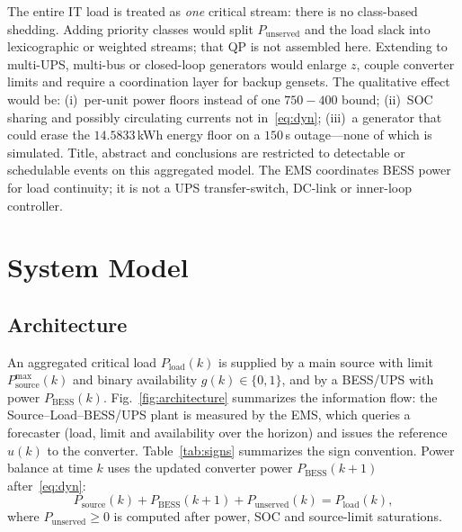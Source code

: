 \documentclass{ieeeaccess}
\begin{document}
The entire IT load is treated as \emph{one} critical stream: there is no class-based shedding. Adding priority classes would split $P_{\mathrm{unserved}}$ and the load slack into lexicographic or weighted streams; that QP is not assembled here. Extending to multi-UPS, multi-bus or closed-loop generators would enlarge $z$, couple converter limits and require a coordination layer for backup gensets. The qualitative effect would be: (i)~per-unit power floors instead of one $750{-}400$ bound; (ii)~SOC sharing and possibly circulating currents not in~\eqref{eq:dyn}; (iii)~a generator that could erase the $14.5833$\,kWh energy floor on a $150$\,s outage---none of which is simulated. Title, abstract and conclusions are restricted to detectable or schedulable events on this aggregated model. The EMS coordinates BESS power for load continuity; it is not a UPS transfer-switch, DC-link or inner-loop controller.

\section{System Model}
\label{sec:model}

\subsection{Architecture}
An aggregated critical load $P_{\mathrm{load}}(k)$ is supplied by a main source with limit $P_{\mathrm{source}}^{\max}(k)$ and binary availability $g(k)\in\{0,1\}$, and by a BESS/UPS with power $P_{\mathrm{BESS}}(k)$. Fig.~\ref{fig:architecture} summarizes the information flow: the Source--Load--BESS/UPS plant is measured by the EMS, which queries a forecaster (load, limit and availability over the horizon) and issues the reference $u(k)$ to the converter. Table~\ref{tab:signs} summarizes the sign convention. Power balance at time $k$ uses the updated converter power $P_{\mathrm{BESS}}(k+1)$ after~\eqref{eq:dyn}:
\begin{equation}
\label{eq:balance}
P_{\mathrm{source}}(k)+P_{\mathrm{BESS}}(k+1)+P_{\mathrm{unserved}}(k)=P_{\mathrm{load}}(k),
\end{equation}
where $P_{\mathrm{unserved}}\ge 0$ is computed after power, SOC and source-limit saturations.
\end{document}
